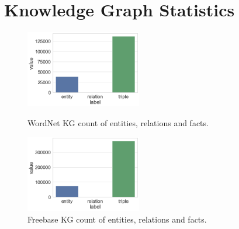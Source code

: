 \chapter{Knowledge Graph Statistics} 

\ifpdf
     \graphicspath{{Figs/Chapter4/}}
\else
    \graphicspath{{Chapter4/Figs/Vector/}{Chapter4/Figs/}}
\fi

\begin{figure}[H]
	\parbox{.5\linewidth}{
   		\centering
    		\includegraphics[width=0.45\textwidth, height=0.3\textwidth]{Wordnet_Counts}
		\captionsetup{justification=centering}
		\caption{WordNet KG count of entities, relations and facts.}
		}
	\hfill
	\parbox{.5\linewidth}{
   		\centering
    		\includegraphics[width=0.45\textwidth, height=0.3\textwidth]{Freebase_Counts}
		\captionsetup{justification=centering}
		\caption{Freebase KG count of entities, relations and facts.}
		}
\end{figure}

